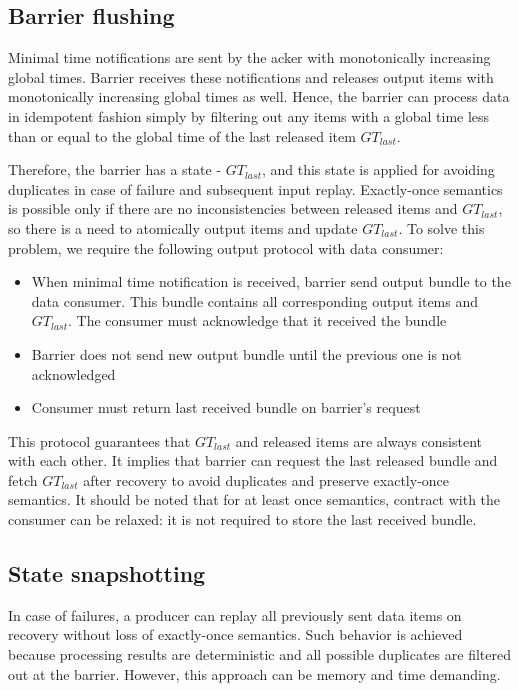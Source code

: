 \subsection{Barrier flushing}
Minimal time notifications are sent by the acker with monotonically increasing global times. Barrier receives these notifications and releases output items with monotonically increasing global times as well. Hence, the barrier can process data in idempotent fashion simply by filtering out any items with a global time less than or equal to the global time of the last released item $GT_{last}$. 

Therefore, the barrier has a state - $GT_{last}$, and this state is applied for avoiding duplicates in case of failure and subsequent input replay. Exactly-once semantics is possible only if there are no inconsistencies between released items and $GT_{last}$, so there is a need to atomically output items and update $GT_{last}$. To solve this problem, we require the following output protocol with data consumer: 

\begin{itemize}
    \item When minimal time notification is received, barrier send output bundle to the data consumer. This bundle contains all corresponding output items and $GT_{last}$. The consumer must acknowledge that it received the bundle
    \item Barrier does not send new output bundle until the previous one is not acknowledged
    \item Consumer must return last received bundle on barrier's request 
\end{itemize}

This protocol guarantees that $GT_{last}$ and released items are always consistent with each other. It implies that barrier can request the last released bundle and fetch $GT_{last}$ after recovery to avoid duplicates and preserve exactly-once semantics. It should be noted that for at least once semantics, contract with the consumer can be relaxed: it is not required to store the last received bundle.

\subsection{State snapshotting}
In case of failures, a producer can replay all previously sent data items on recovery without loss of exactly-once semantics. Such behavior is achieved because processing results are deterministic and all possible duplicates are filtered out at the barrier. However, this approach can be memory and time demanding. 

